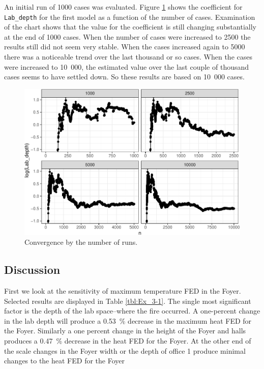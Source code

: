 \documentclass[12pt,twoside]{book}
\begin{document}
An initial run of 1000 cases was evaluated. Figure \ref{Ex_3-convergence_of_mean} shows the coefficient for \texttt{Lab\_depth} for the first model as a function of the number of cases. Examination of the chart shows that the value for the coefficient is still changing substantially at the end of 1000 cases. When the number of cases were increased to 2500 the results still did not seem very stable. When the cases increased again to 5000 there was a noticeable trend over the last thousand or so cases. When the cases were increased to 10~000, the estimated value over the last couple of thousand cases seems to have settled down. So these results are based on 10~000 cases.

\begin{figure}[h!]
\centering
\includegraphics[width=4.5in]{FIGURES/ex2_cvg_plot-1.pdf}
\caption{Convergence by the number of runs.}
\label{Ex_3-convergence_of_mean}
\end{figure}

\hypertarget{discussion}{%
\subsection{Discussion}\label{discussion}}

First we look at the sensitivity of maximum temperature FED in the Foyer. Selected results are displayed in Table  \ref{tbl:Ex_3-1}. The single most significant factor is the depth of the lab space--where the fire occurred. A one-percent change in the lab depth will produce a 0.53~\% decrease in the maximum heat FED for the Foyer. Similarly a one percent change in the height of the Foyer and halls produces a 0.47~\% decrease in the heat FED for the Foyer. At the other end of the scale changes in the Foyer width or the depth of office 1 produce minimal changes to the heat FED for the Foyer
\end{document}
